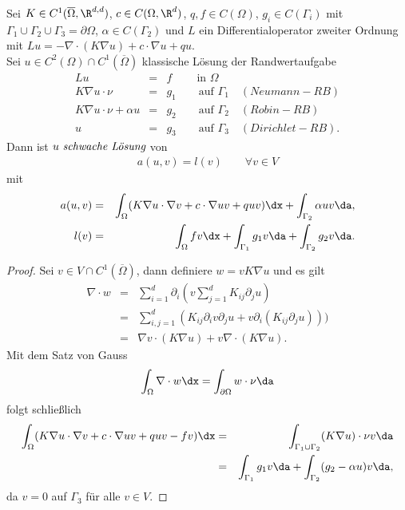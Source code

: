\begin{Satz}
    \label{satz:3.21}
    Sei $K\in C^1(\overline\Omega, \R^{d,d})$, $c\in C(\Omega, \R^d)$, $q,f
    \in C(\Omega)$, $g_i\in C(\Gamma_i)$ mit $\Gamma_1 \cup \Gamma_2 \cup
    \Gamma_3 = \partial\Omega$, $\alpha\in C(\Gamma_2)$ und $L$ ein Differentialoperator zweiter Ordnung mit $L u = -\nabla \cdot (K \nabla u) + c \cdot \nabla u + q u$. \\
    Sei $u\in C^2(\Omega) \cap C^1(\overline\Omega)$ klassische Lösung der
    Randwertaufgabe
    \begin{eqnarray*}
        L u &=& f \qquad \ \text{in } \Omega \\
        K \nabla u \cdot \nu &=& g_1 \qquad \text{auf } \Gamma_1 \quad (Neumann-RB) \\
        K \nabla u \cdot \nu + \alpha u &=& g_2 \qquad \text{auf } \Gamma_2 \quad (Robin-RB) \\
        u &=& g_3 \qquad \text{auf } \Gamma_3 \quad (Dirichlet-RB).
    \end{eqnarray*}
    Dann ist $u \ \emph{schwache Lösung}$ von
    \begin{eqnarray*}
        a(u,v) = l(v) \qquad \forall v\in V
    \end{eqnarray*}
    mit
    \begin{eqnarray*}
            a(u,v)
        &=& \int_\Omega (K \nabla u \cdot \nabla v + c \cdot \nabla u v + q u v)
            \dx + \int_{\Gamma_2} \alpha u v \da, \\
            l(v)
        &=& \int_{\Omega} f v \dx + \int_{\Gamma_1} g_1 v \da
            + \int_{\Gamma_2} g_2 v \da.
    \end{eqnarray*}
\end{Satz}


\begin{proof}
    Sei $v\in V \cap C^1(\overline\Omega)$, dann definiere $w = v K \nabla u$
    und es  gilt
    \begin{eqnarray*}
            \nabla \cdot w
        &=& \sum_{i = 1}^d \partial_i \left(v \sum_{j=1}^d K_{ij} \partial_j u
            \right) \\
        &=& \sum_{i,j = 1}^d (K_{ij} \partial_i v \partial_j u + v \partial_i
            (K_{ij} \partial_j u))) \\
        &=& \nabla v \cdot (K \nabla u) + v \nabla \cdot (K \nabla u).
    \end{eqnarray*}
    Mit dem Satz von Gauss
    \begin{eqnarray*}
        \int_\Omega \nabla \cdot w \dx = \int_{\partial\Omega} w \cdot \nu
        \da
    \end{eqnarray*}
    folgt schlie\ss{}lich
    \begin{eqnarray*}
            \int_\Omega (K \nabla u \cdot \nabla v + c \cdot \nabla u v + q u v
            - f v) \dx
        &=& \int_{\Gamma_1 \cup \Gamma_2} (K \nabla u) \cdot \nu v \da \\
        &=& \int_{\Gamma_1} g_1 v \da + \int_{\Gamma_2} (g_2 - \alpha u) v
            \da,
    \end{eqnarray*}
    da $v = 0$ auf $\Gamma_3$ für alle $v\in V$.
\end{proof}


